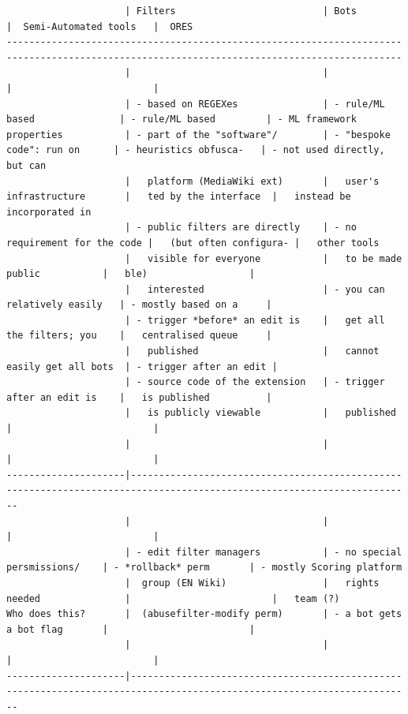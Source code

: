 \begin{verbatim}
                     | Filters                          | Bots                          |  Semi-Automated tools   |  ORES
--------------------------------------------------------------------------------------------------------------------------------------------
                     |                                  |                               |                         |
                     | - based on REGEXes               | - rule/ML based               | - rule/ML based         | - ML framework
properties           | - part of the "software"/        | - "bespoke code": run on      | - heuristics obfusca-   | - not used directly, but can
                     |   platform (MediaWiki ext)       |   user's infrastructure       |   ted by the interface  |   instead be incorporated in
                     | - public filters are directly    | - no requirement for the code |   (but often configura- |   other tools
                     |   visible for everyone           |   to be made public           |   ble)                  |
                     |   interested                     | - you can relatively easily   | - mostly based on a     |
                     | - trigger *before* an edit is    |   get all the filters; you    |   centralised queue     |
                     |   published                      |   cannot easily get all bots  | - trigger after an edit |
                     | - source code of the extension   | - trigger after an edit is    |   is published          |
                     |   is publicly viewable           |   published                   |                         |
                     |                                  |                               |                         |
---------------------|------------------------------------------------------------------------------------------------------------------------
                     |                                  |                               |                         |
                     | - edit filter managers           | - no special persmissions/    | - *rollback* perm       | - mostly Scoring platform
                     |  group (EN Wiki)                 |   rights needed               |                         |   team (?)
Who does this?       |  (abusefilter-modify perm)       | - a bot gets a bot flag       |                         |
                     |                                  |                               |                         |
---------------------|------------------------------------------------------------------------------------------------------------------------

\end{verbatim}
